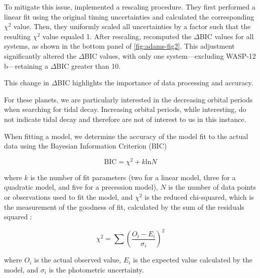 \documentclass[oneside,12pt]{amsart}
\numberwithin{page}{section}
\begin{document}
To mitigate this issue, \citet{adams2024doomed} implemented a rescaling procedure. They first performed a linear fit using the original timing uncertainties and calculated the corresponding $\chi^2$ value. Then, they uniformly scaled all uncertainties by a factor such that the resulting $\chi^2$ value equaled 1. After rescaling, \citep{adams2024doomed} recomputed the $\Delta$BIC values for all systems, as shown in the bottom panel of \ref{fig:adams-fig2}. This adjustment significantly altered the $\Delta$BIC values, with only one system—excluding WASP-12 b—retaining a $\Delta$BIC greater than 10.

This change in $\Delta$BIC highlights the importance of data processing and accuracy. 


For these planets, we are particularly interested in the decreasing orbital periods when searching for tidal decay. Increasing orbital periods, while interesting, do not indicate tidal decay and therefore are not of interest to us in this instance. 

When fitting a model, we determine the accuracy of the model fit to the actual data using the Bayesian Information Criterion (BIC) \citep{schwarz1978estimating}

\begin{equation}
    \text{BIC} = \chi^{2} + k\text{ln}N
\end{equation}

where $k$ is the number of fit parameters (two for a linear model, three for a quadratic model, and five for a precession model), $N$ is the number of data points or observations used to fit the model, and $\chi^{2}$ is the reduced chi-squared, which is the measurement of the goodness of fit, calculated by the sum of the residuals squared \citep{pearson1900criterion}:

\begin{equation}
    \chi^{2} = \sum \left( \frac{O_i - E_i}{\sigma_i} \right)^2
\end{equation}

where $O_i$ is the actual observed value, $E_i$ is the expected value calculated by the model, and $\sigma_i$ is the photometric uncertainty.
\end{document}
